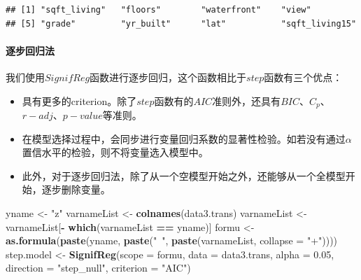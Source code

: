 \documentclass[]{article}
\newenvironment{Shaded}{\begin{snugshade}}{\end{snugshade}}
\newcommand{\KeywordTok}[1]{\textcolor[rgb]{0.13,0.29,0.53}{\textbf{#1}}}
\newcommand{\DataTypeTok}[1]{\textcolor[rgb]{0.13,0.29,0.53}{#1}}
\newcommand{\FloatTok}[1]{\textcolor[rgb]{0.00,0.00,0.81}{#1}}
\newcommand{\StringTok}[1]{\textcolor[rgb]{0.31,0.60,0.02}{#1}}
\newcommand{\OperatorTok}[1]{\textcolor[rgb]{0.81,0.36,0.00}{\textbf{#1}}}
\newcommand{\NormalTok}[1]{#1}
\providecommand{\tightlist}{%
  \setlength{\itemsep}{0pt}\setlength{\parskip}{0pt}}
\let\oldparagraph\paragraph
\renewcommand{\paragraph}[1]{\oldparagraph{#1}\mbox{}}
\begin{document}
\begin{verbatim}
## [1] "sqft_living"   "floors"        "waterfront"    "view"         
## [5] "grade"         "yr_built"      "lat"           "sqft_living15"
\end{verbatim}

\paragraph{逐步回归法}

我们使用\(SignifReg\)函数进行逐步回归，这个函数相比于\(step\)函数有三个优点：

\begin{itemize}
\tightlist
\item
  具有更多的criterion。除了\(step\)函数有的\(AIC\)准则外，还具有\(BIC\)、\(C_p\)、\(r-adj\)、\(p-value\)等准则。
\item
  在模型选择过程中，会同步进行变量回归系数的显著性检验。如若没有通过\(\alpha\)置信水平的检验，则不将变量选入模型中。
\item
  此外，对于逐步回归法，除了从一个空模型开始之外，还能够从一个全模型开始，逐步删除变量。
\end{itemize}

\begin{Shaded}
\begin{Highlighting}[]
\NormalTok{yname <-}\StringTok{ "z"}
\NormalTok{varnameList <-}\StringTok{ }\KeywordTok{colnames}\NormalTok{(data3.trans)}
\NormalTok{varnameList <-}\StringTok{ }\NormalTok{varnameList[}\OperatorTok{-}\StringTok{ }\KeywordTok{which}\NormalTok{(varnameList }\OperatorTok{==}\StringTok{ }\NormalTok{yname)]}
\NormalTok{formu <-}\StringTok{ }\KeywordTok{as.formula}\NormalTok{(}\KeywordTok{paste}\NormalTok{(yname, }\KeywordTok{paste}\NormalTok{(}\StringTok{"~"}\NormalTok{, }\KeywordTok{paste}\NormalTok{(varnameList, }\DataTypeTok{collapse =} \StringTok{"+"}\NormalTok{))))}
\NormalTok{step.model <-}\StringTok{ }\KeywordTok{SignifReg}\NormalTok{(}\DataTypeTok{scope =}\NormalTok{ formu, }\DataTypeTok{data =}\NormalTok{ data3.trans, }\DataTypeTok{alpha =} \FloatTok{0.05}\NormalTok{, }
                        \DataTypeTok{direction =} \StringTok{"step_null"}\NormalTok{, }\DataTypeTok{criterion =} \StringTok{"AIC"}\NormalTok{)}
\end{Highlighting}
\end{Shaded}
\end{document}

